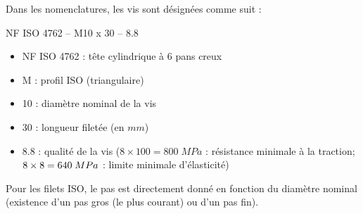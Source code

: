 \documentclass[11pt,oneside]{article}
\begin{document}
Dans les nomenclatures, les vis sont désignées comme suit : 

\noindent\noindent\begin{minipage}[c]{.46\linewidth}
\begin{center}
NF ISO 4762 -- M10 x 30 -- 8.8
\end{center}
\end{minipage}\hfill
\noindent\begin{minipage}[c]{.46\linewidth}
\begin{itemize}
\item NF ISO 4762 : tête cylindrique à 6 pans creux
\item M : profil ISO (triangulaire)
\item 10 : diamètre nominal de la vis 
\item 30 : longueur filetée (en $mm$)
\item 8.8 : qualité de la vis ($8\times 100=800\; MPa$ : résistance minimale à la traction; $8\times 8 \time 10 = 640 \; MPa$ : limite minimale d'élasticité)
\end{itemize}
\end{minipage}

\vspace{.25cm}
Pour les filets ISO, le pas est directement donné en fonction du diamètre nominal (existence d'un pas gros (le plus courant) ou d'un pas fin).
\end{document}
